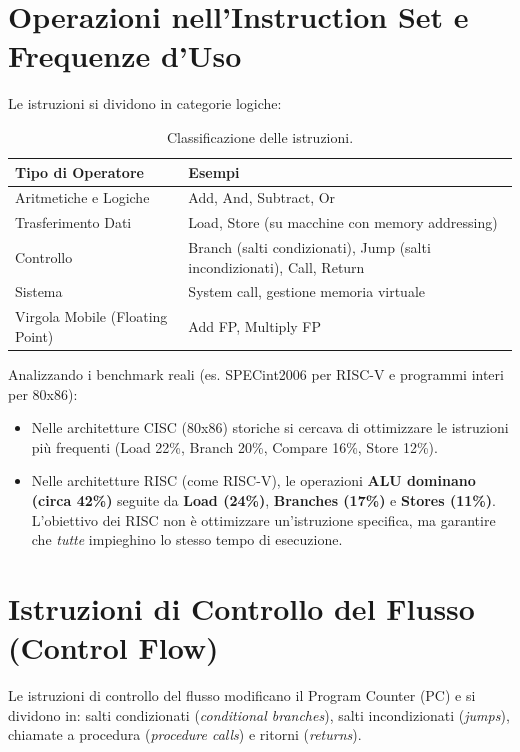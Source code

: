 \section{Operazioni nell'Instruction Set e Frequenze d'Uso}
Le istruzioni si dividono in categorie logiche:
\begin{table}[H]
\centering
\begin{tabular}{|l|p{10cm}|}
\hline
\textbf{Tipo di Operatore} & \textbf{Esempi} \\ \hline
Aritmetiche e Logiche & Add, And, Subtract, Or \\ \hline
Trasferimento Dati & Load, Store (su macchine con memory addressing) \\ \hline
Controllo & Branch (salti condizionati), Jump (salti incondizionati), Call, Return \\ \hline
Sistema & System call, gestione memoria virtuale \\ \hline
Virgola Mobile (Floating Point) & Add FP, Multiply FP \\ \hline
\end{tabular}
\caption{Classificazione delle istruzioni.}
\end{table}

Analizzando i benchmark reali (es. SPECint2006 per RISC-V e programmi interi per 80x86):
\begin{itemize}
    \item Nelle architetture CISC (80x86) storiche si cercava di ottimizzare le istruzioni più frequenti (Load 22\%, Branch 20\%, Compare 16\%, Store 12\%).
    \item Nelle architetture RISC (come RISC-V), le operazioni \textbf{ALU dominano (circa 42\%)} seguite da \textbf{Load (24\%)}, \textbf{Branches (17\%)} e \textbf{Stores (11\%)}. L'obiettivo dei RISC non è ottimizzare un'istruzione specifica, ma garantire che \textit{tutte} impieghino lo stesso tempo di esecuzione.
\end{itemize}

\section{Istruzioni di Controllo del Flusso (Control Flow)}
Le istruzioni di controllo del flusso modificano il Program Counter (PC) e si dividono in: salti condizionati (\textit{conditional branches}), salti incondizionati (\textit{jumps}), chiamate a procedura (\textit{procedure calls}) e ritorni (\textit{returns}).

